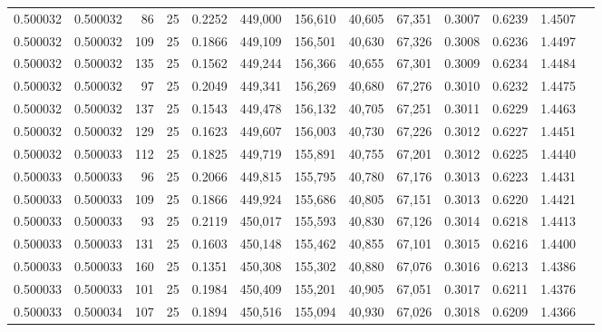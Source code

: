 \begin{tabular}{rrrrrrrrrrrrr}
0.500032 & 0.500032 &    86 &  25 &                                     0.2252 & 449,000 & 156,610 &  40,605 &  67,351 & 0.3007 & 0.6239 & 1.4507 \\
0.500032 & 0.500032 &   109 &  25 &                                     0.1866 & 449,109 & 156,501 &  40,630 &  67,326 & 0.3008 & 0.6236 & 1.4497 \\
0.500032 & 0.500032 &   135 &  25 &                                     0.1562 & 449,244 & 156,366 &  40,655 &  67,301 & 0.3009 & 0.6234 & 1.4484 \\
0.500032 & 0.500032 &    97 &  25 &                                     0.2049 & 449,341 & 156,269 &  40,680 &  67,276 & 0.3010 & 0.6232 & 1.4475 \\
0.500032 & 0.500032 &   137 &  25 &                                     0.1543 & 449,478 & 156,132 &  40,705 &  67,251 & 0.3011 & 0.6229 & 1.4463 \\
0.500032 & 0.500032 &   129 &  25 &                                     0.1623 & 449,607 & 156,003 &  40,730 &  67,226 & 0.3012 & 0.6227 & 1.4451 \\
0.500032 & 0.500033 &   112 &  25 &                                     0.1825 & 449,719 & 155,891 &  40,755 &  67,201 & 0.3012 & 0.6225 & 1.4440 \\
0.500033 & 0.500033 &    96 &  25 &                                     0.2066 & 449,815 & 155,795 &  40,780 &  67,176 & 0.3013 & 0.6223 & 1.4431 \\
0.500033 & 0.500033 &   109 &  25 &                                     0.1866 & 449,924 & 155,686 &  40,805 &  67,151 & 0.3013 & 0.6220 & 1.4421 \\
0.500033 & 0.500033 &    93 &  25 &                                     0.2119 & 450,017 & 155,593 &  40,830 &  67,126 & 0.3014 & 0.6218 & 1.4413 \\
0.500033 & 0.500033 &   131 &  25 &                                     0.1603 & 450,148 & 155,462 &  40,855 &  67,101 & 0.3015 & 0.6216 & 1.4400 \\
0.500033 & 0.500033 &   160 &  25 &                                     0.1351 & 450,308 & 155,302 &  40,880 &  67,076 & 0.3016 & 0.6213 & 1.4386 \\
0.500033 & 0.500033 &   101 &  25 &                                     0.1984 & 450,409 & 155,201 &  40,905 &  67,051 & 0.3017 & 0.6211 & 1.4376 \\
0.500033 & 0.500034 &   107 &  25 &                                     0.1894 & 450,516 & 155,094 &  40,930 &  67,026 & 0.3018 & 0.6209 & 1.4366 \\

\end{tabular}

